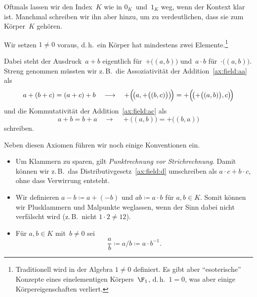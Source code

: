 \documentclass[a4paper]{article}
\begin{document}
Oftmals lassen wir den Index~$K$ wie in $0_K$~und~$1_K$ weg, wenn der Kontext klar ist. Manchmal schreiben wir ihn aber hinzu, um zu verdeutlichen, dass sie zum Körper~$K$ gehören.

\begin{remark}
    Wir setzen $1 \neq 0$ voraus, d.\,h.\ ein Körper hat mindestens zwei Elemente.\footnote{Traditionell wird in der Algebra $1 \neq 0$ definiert. Es gibt aber "`esoterische"' Konzepte eines einelementigen Körpers~$\F_1$, d.\,h.\ $1 = 0$, was aber einige Körpereigenschaften verliert.}
\end{remark}

\begin{remark}
    Dabei steht der Ausdruck~$a+b$ eigentlich für~$+\bigl((a, b)\bigr)$ und~$a\cdot b$ für~$\cdot\bigl((a, b)\bigr)$. Streng genommen müssten wir z.\,B.\ die Assoziativität der Addition~\ref{ax:field:aa} als
    \begin{equation*}
        a+(b+c) = (a+c)+b \quad\longrightarrow\quad  +\Bigl(\!\bigl(a, +\bigl((b, c)\bigr)\bigr)\!\Bigr) = +\Bigl(\!\bigl(+\bigl((a, b)\bigr), c\bigr)\!\Bigr)
    \end{equation*}
    und die Kommutativität der Addition~\ref{ax:field:ac} als
    \begin{equation*}
        a+b = b+a \quad\longrightarrow\quad +\bigl((a, b)\bigr) = +\bigl((b, a)\bigr)
    \end{equation*}
    schreiben.
\end{remark}

\begin{notation}\label{not:field:convention}
    Neben diesen Axiomen führen wir noch einige Konventionen ein.
    \begin{itemize}
        \item Um Klammern zu sparen, gilt \emph{Punktrechnung vor Strichrechnung}. Damit können wir z.\,B.\ das Distributivgesetz~\ref{ax:field:d} umschreiben als $a\cdot c + b\cdot c$, ohne dass Verwirrung entsteht.
        \item Wir definieren $a-b \coloneqq a+(-b)$ und $ab \coloneqq a\cdot b$ für $a, b \in K$. Somit können wir Plusklammern und Malpunkte weglassen, wenn der Sinn dabei nicht verfälscht wird (z.\,B.\ nicht $1 \cdot 2 \neq 12$).
        \item Für $a, b \in K$ mit~$b \neq 0$ sei
        \begin{equation*}
            \frac{a}{b} \coloneqq a/b \coloneqq a \cdot b^{-1}.
        \end{equation*}
    \end{itemize}
\end{notation}
\end{document}
